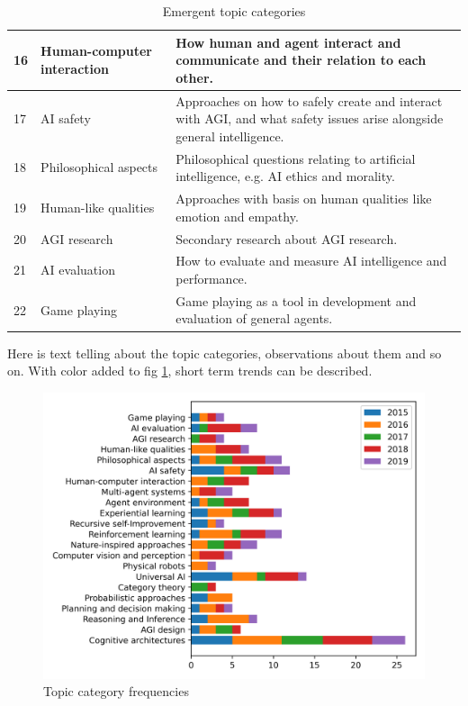 \documentclass[utf8,english]{gradu3}
\begin{document}
\begin{table}[H]
\begin{tabular}{p{0.05\linewidth} p{0.30\linewidth} p{0.65\linewidth}}
    16 & Human-computer interaction & How human and agent interact and communicate and their relation to each other.\\ \hline
    17 & AI safety & Approaches on how to safely create and interact with AGI, and what safety issues arise alongside general intelligence.\\ \hline
    18 & Philosophical aspects & Philosophical questions relating to artificial intelligence, e.g. AI ethics and morality.\\ \hline
    19 & Human-like qualities & Approaches with basis on human qualities like emotion and empathy.\\ \hline
    20 & AGI research & Secondary research about AGI research. \\ \hline
    21 & AI evaluation & How to evaluate and measure AI intelligence and performance.\\ \hline
    22 & Game playing  & Game playing as a tool in development and evaluation of general agents.\\ \hline

  \end{tabular}
  \caption{Emergent topic categories}
  \label{table:topicdescription}
\end{table}



Here is text telling about the topic categories, observations about them and so
on. With color added to fig \ref{fig:topicbar}, short term trends can be described.

\begin{figure}[H]
  \centering
  \includegraphics[scale=0.8]{material/data/topic_frequencies_by_year.png}
  \caption{Topic category frequencies}
  \label{fig:topicbar}
\end{figure}
\end{document}
